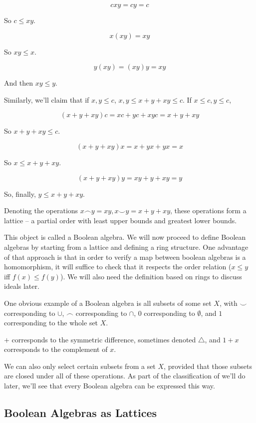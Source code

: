 \documentclass{article}
\begin{document}
      \[ cxy = cy = c\]

      So $c \leq xy$.

      \[ x(xy) = xy\]

      So $xy \leq x$.

      \[ y(xy) = (xy)y = xy\]

      And then $xy \leq y$.

      Similarly, we'll claim that if $x,y \leq c$, $x,y \leq x + y + xy \leq c$.
      If $x \leq c, y \leq c$,

      \[(x + y + xy)c = xc + yc + xyc = x + y + xy\]

      So $x + y + xy \leq c$.

      \[(x + y + xy)x = x + yx + yx = x\]

      So $x \leq x + y + xy$.

      \[(x + y + xy)y = xy + y + xy = y\]

      So, finally, $y \leq x + y + xy$.

      Denoting the operations $x \frown y = xy, x \smile y = x + y + xy$, these
      operations form a lattice -- a partial order with least upper bounds and
      greatest lower bounds.

      This object is called a Boolean algebra. We will now proceed to define
      Boolean algebras by starting from a lattice and defining a ring structure.
      One advantage of that approach is that in order to verify a map between
      boolean algebras is a homomorphism, it will suffice to check that it
      respects the order relation ($x \leq y$ iff $f(x) \leq f(y)$). We will also
      need the definition based on rings to discuss ideals later.

      One obvious example of a Boolean algebra is all subsets of some set $X$,
      with $\smile$ corresponding to $\cup$, $\frown$ corresponding to $\cap$,
      $0$ corresponding to $\emptyset$, and $1$ corresponding to the whole set
      $X$.

      $+$ corresponds to the symmetric difference, sometimes denoted
      $\triangle$, and $1 + x$ corresponds to the complement of $x$.

      We can also only select certain subsets from a set $X$, provided that
      those subsets are closed under all of these operations. As part of the
      classification of we'll do later, we'll see that every Boolean algebra can
      be expressed this way.

    \subsection{Boolean Algebras as Lattices}
\end{document}
